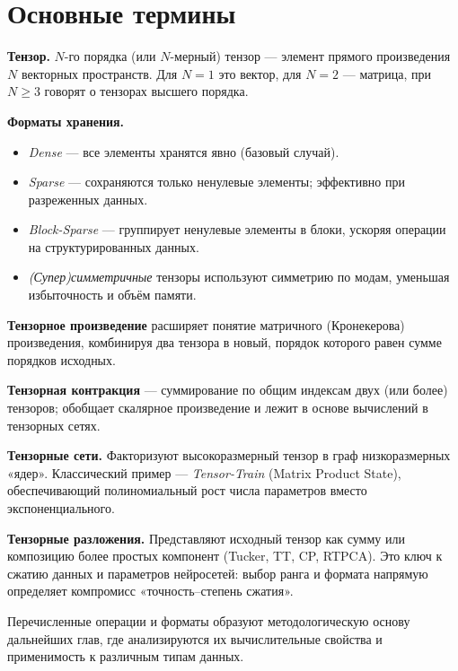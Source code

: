 \chapter{Основные термины}
\label{chap:preliminaries}

\textbf{Тензор.} $N$-го порядка (или $N$-мерный) тензор — элемент прямого произведения $N$ векторных пространств. Для $N{=}1$ это вектор, для $N{=}2$ — матрица, при $N\!\ge\!3$ говорят о тензорах высшего порядка.  

\textbf{Форматы хранения.}  
\begin{itemize}\setlength\itemsep{0.2em}
    \item \emph{Dense} — все элементы хранятся явно (базовый случай).  
    \item \emph{Sparse} — сохраняются только ненулевые элементы; эффективно при разреженных данных.  
    \item \emph{Block-Sparse} — группирует ненулевые элементы в блоки, ускоряя операции на структурированных данных.  
    \item \emph{(Супер)симметричные} тензоры используют симметрию по модам, уменьшая избыточность и объём памяти.  
\end{itemize}

\textbf{Тензорное произведение} расширяет понятие матричного (Кронекерова) произведения, комбинируя два тензора в новый, порядок которого равен сумме порядков исходных.  

\textbf{Тензорная контракция} — суммирование по общим индексам двух (или более) тензоров; обобщает скалярное произведение и лежит в основе вычислений в тензорных сетях.  

\textbf{Тензорные сети.} Факторизуют высокоразмерный тензор в граф низкоразмерных «ядер». Классический пример — \emph{Tensor-Train} (Matrix Product State), обеспечивающий полиномиальный рост числа параметров вместо экспоненциального.  

\textbf{Тензорные разложения.} Представляют исходный тензор как сумму или композицию более простых компонент (Tucker, TT, CP, RTPCA). Это ключ к сжатию данных и параметров нейросетей: выбор ранга и формата напрямую определяет компромисс «точность–степень сжатия».  

Перечисленные операции и форматы образуют методологическую основу дальнейших глав, где анализируются их вычислительные свойства и применимость к различным типам данных.